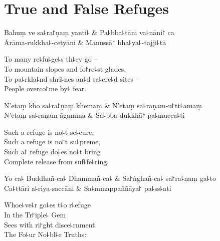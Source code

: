 \artoptfalse
\chapter{True and False Refuges}%

\begin{leader}
\end{leader}

\begin{twochants}
  Bahuṃ ve sa꜕ra꜓ṇaṃ yanti꜕ & Pa꜕bba꜕tāni va꜕nāni꜓ ca \\
  Ārāma-rukkha꜕-cetyāni & Manussā꜓ bha꜕ya꜕-tajji꜕tā \\
\end{twochants}

\begin{english}
  To many re꜕fu꜕ge꜕s th꜕ey go --\\
  To mountain slopes and fo꜓re꜕st glades,\\
  To pa꜕rkla꜕nd shri꜕nes an꜕d sa꜕cre꜕d sites --\\
  People overco꜓me by꜕ fear.
\end{english}

\begin{twochants}
  N'etaṃ kho sa꜕ra꜓ṇaṃ khemaṃ & N'etaṃ sa꜕raṇam-u꜓tt꜕amaṃ \\
  N'etaṃ sa꜕raṇam-āgamma & Sa꜕bba-dukkhā꜓ pa꜕mucca꜕ti \\
\end{twochants}

\begin{english}
  Such a refuge is no꜕t se꜕cure,\\
  Such a refuge is no꜓t su꜕preme,\\
  Such a꜓ refuge do꜕es no꜕t bring\\
  Complete release from suf꜕fe꜕ring.
\end{english}

\begin{twochants}
  Yo ca꜕ Buddhañ-ca꜕ Dhammañ-ca꜕ & Sa꜓ṅghañ-ca꜕ sa꜓ra꜕ṇaṃ ga꜕to \\
  Ca꜕ttāri a꜕riya-saccāni & Sa꜕mmappaññāya꜓ pa꜕ss꜕ati \\
\end{twochants}

\begin{english}
  Whoe꜕ve꜕r go꜕es t꜕o r꜕efuge\\
  In the Tr꜓iple꜕ Gem\\
  Sees with ri꜓ght disce꜕rnment\\
  The Fo꜕ur No꜕bl꜕e Truths:
\end{english}

